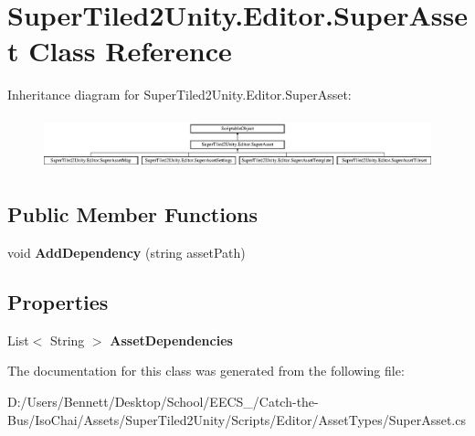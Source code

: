 \hypertarget{class_super_tiled2_unity_1_1_editor_1_1_super_asset}{}\section{Super\+Tiled2\+Unity.\+Editor.\+Super\+Asset Class Reference}
\label{class_super_tiled2_unity_1_1_editor_1_1_super_asset}
Inheritance diagram for Super\+Tiled2\+Unity.\+Editor.\+Super\+Asset\+:\begin{figure}[H]
\begin{center}
\leavevmode
\includegraphics[height=1.544118cm]{class_super_tiled2_unity_1_1_editor_1_1_super_asset}
\end{center}
\end{figure}
\subsection*{Public Member Functions}
\begin{DoxyCompactItemize}
\item 
\mbox{\label{class_super_tiled2_unity_1_1_editor_1_1_super_asset_a90f99d7f94aa50ca555b030347c99537}} 
void {\bfseries Add\+Dependency} (string asset\+Path)
\end{DoxyCompactItemize}
\subsection*{Properties}
\begin{DoxyCompactItemize}
\item 
\mbox{\label{class_super_tiled2_unity_1_1_editor_1_1_super_asset_a16e59de082fa9f942de4a25784bb6046}} 
List$<$ String $>$ {\bfseries Asset\+Dependencies}
\end{DoxyCompactItemize}


The documentation for this class was generated from the following file\+:\begin{DoxyCompactItemize}
\item 
D\+:/\+Users/\+Bennett/\+Desktop/\+School/\+E\+E\+C\+S\+\_/\+Catch-\/the-\/\+Bus/\+Iso\+Chai/\+Assets/\+Super\+Tiled2\+Unity/\+Scripts/\+Editor/\+Asset\+Types/Super\+Asset.\+cs\end{DoxyCompactItemize}
